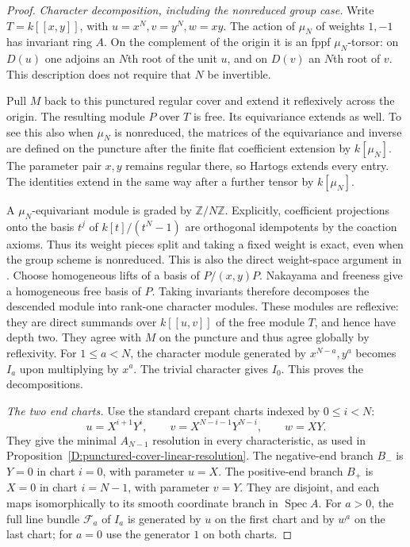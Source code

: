 \begin{proof}
\emph{Character decomposition, including the nonreduced group case.}
Write $T=k[[x,y]]$, with
$u=x^N,v=y^N,w=xy$. The action of $\mu_N$ of weights $1,-1$
has invariant ring $A$. On the complement of the origin it is an
fppf $\mu_N$-torsor: on $D(u)$ one adjoins an $N$th root of the
unit $u$, and on $D(v)$ an $N$th root of $v$.
This description does not require that $N$ be invertible.

Pull $M$ back to this punctured regular cover and extend it
reflexively across the origin. The resulting module $P$ over $T$
is free. Its equivariance extends as well. To see this also when
$\mu_N$ is nonreduced, the matrices of the equivariance and inverse
are defined on the puncture after the finite flat coefficient
extension by $k[\mu_N]$. The parameter pair $x,y$ remains regular
there, so Hartogs extends every entry. The identities extend in
the same way after a further tensor by $k[\mu_N]$.

A $\mu_N$-equivariant module is graded by $\mathbb Z/N\mathbb Z$.
Explicitly, coefficient projections onto the basis $t^j$ of
$k[t]/(t^N-1)$ are orthogonal idempotents by the coaction axioms.
Thus its weight pieces split and taking a fixed weight is exact,
even when the group scheme is nonreduced. This is also the direct
weight-space argument in \citet[Theorem 12.12 and Remark 12.13,
pp.~234--235]{C_MilneAG2022}.
Choose homogeneous lifts of a basis of $P/(x,y)P$.
Nakayama and freeness give a homogeneous free basis of $P$.
Taking invariants therefore decomposes the descended module into
rank-one character modules. These modules are reflexive: they are
direct summands over $k[[u,v]]$ of the free module $T$, and hence
have depth two. They agree with $M$ on the puncture and thus agree
globally by reflexivity.
For $1\le a<N$, the character module generated by
$x^{N-a},y^a$ becomes $I_a$ upon multiplying by $x^a$.
The trivial character gives $I_0$. This proves the decompositions.

\emph{The two end charts.}
Use the standard crepant charts indexed by $0\le i<N$:
\[
 u=X^{i+1}Y^i,\qquad
 v=X^{N-i-1}Y^{N-i},\qquad w=XY.                       \tag{D.HF.5}
\]
They give the minimal $A_{N-1}$ resolution in every characteristic,
as used in Proposition~\ref{D:punctured-cover-linear-resolution}.
The negative-end branch $B_-$ is $Y=0$ in chart $i=0$, with
parameter $u=X$. The positive-end branch $B_+$ is $X=0$ in chart
$i=N-1$, with parameter $v=Y$. They are disjoint, and each maps
isomorphically to its smooth coordinate branch in $\operatorname{Spec}A$.
For $a>0$, the full line bundle $\mathcal F_a$ of $I_a$ is generated
by $u$ on the first chart and by $w^a$ on the last chart; for $a=0$
use the generator $1$ on both charts.


\end{proof}
